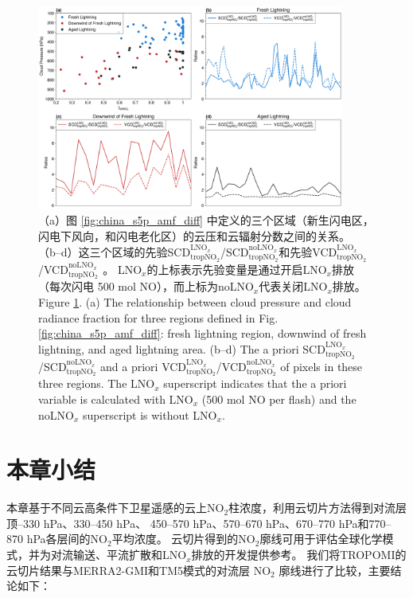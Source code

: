 \begin{figure}[H]
    \centering
    \includegraphics[width=0.9\textwidth]{./figures/china_amf_contribution.png}
    \caption{
    （a）图 \ref{fig:china_s5p_amf_diff} 中定义的三个区域（新生闪电区，闪电下风向，和闪电老化区）的云压和云辐射分数之间的关系。
     （b--d）这三个区域的先验SCD$^{\textrm{LNO$_x$}}_{\textrm{tropNO$_2$}}$/SCD$^{\textrm{noLNO$_x$}}_{ \textrm{tropNO$_2$}}$和先验VCD$^{\textrm{LNO$_x$}}_{\textrm{tropNO$_2$}}$/VCD$^{\textrm{noLNO$_x$ }}_{\textrm{tropNO$_2$}}$。
     LNO$_x$的上标表示先验变量是通过开启LNO$_x$排放（每次闪电 500 mol NO），而上标为noLNO$_x$代表关闭LNO$_x$排放。\\
     Figure \ref{fig:china_amf_contribution}. (a) The relationship between cloud pressure and cloud radiance fraction for three regions defined in Fig. \ref{fig:china_s5p_amf_diff}: fresh lightning region, downwind of fresh lightning, and aged lightning area.
    (b--d) The a priori SCD$^{\textrm{LNO$_x$}}_{\textrm{tropNO$_2$}}$/SCD$^{\textrm{noLNO$_x$}}_{\textrm{tropNO$_2$}}$ and a priori VCD$^{\textrm{LNO$_x$}}_{\textrm{tropNO$_2$}}$/VCD$^{\textrm{noLNO$_x$}}_{\textrm{tropNO$_2$}}$ of pixels in these three regions. The LNO$_x$ superscript indicates that the a priori variable is calculated with LNO$_x$ (500 mol NO per flash) and the noLNO$_x$ superscript is without LNO$_x$.
    }
    \label{fig:china_amf_contribution}
\end{figure}


\section{本章小结}

本章基于不同云高条件下卫星遥感的云上NO$_2$柱浓度，利用云切片方法得到对流层顶--330 hPa、330--450 hPa、
450--570 hPa、570--670 hPa、670--770 hPa和770--870 hPa各层间的NO$_2$平均浓度。
云切片得到的NO$_2$廓线可用于评估全球化学模式，并为对流输送、平流扩散和LNO$_x$排放的开发提供参考。
我们将TROPOMI的云切片结果与MERRA2-GMI和TM5模式的对流层 NO$_2$ 廓线进行了比较，主要结论如下：

